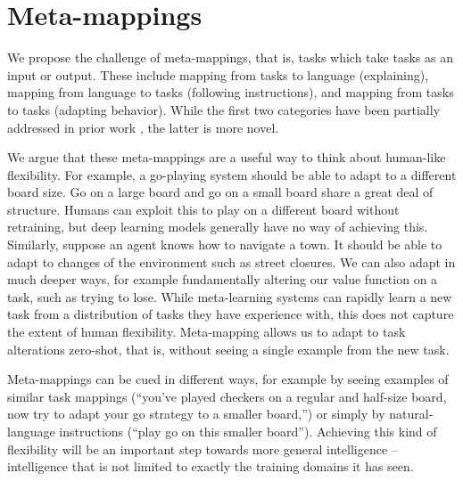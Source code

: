 \documentclass{article}
\begin{document}
\section{Meta-mappings}
We propose the challenge of meta-mappings, that is, tasks which take tasks as an input or output. These include mapping from tasks to language (explaining), mapping from language to tasks (following instructions), and mapping from tasks to tasks (adapting behavior). While the first two categories have been partially addressed in prior work \citep[e.g.][]{Hermann2017, Co-Reyes2019}, the latter is more novel. \par
We argue that these meta-mappings are a useful way to think about human-like flexibility. For example, a go-playing system should be able to adapt to a different board size. Go on a large board and go on a small board share a great deal of structure. Humans can exploit this to play on a different board without retraining, but deep learning models generally have no way of achieving this. Similarly, suppose an agent knows how to navigate a town. It should be able to adapt to changes of the environment such as street closures. We can also adapt in much deeper ways, for example fundamentally altering our value function on a task, such as trying to lose. While meta-learning systems can rapidly learn a new task from a distribution of tasks they have experience with, this does not capture the extent of human flexibility. Meta-mapping allows us to adapt to task alterations zero-shot, that is, without seeing a single example from the new task. \par
Meta-mappings can be cued in different ways, for example by seeing examples of similar task mappings (``you've played checkers on a regular and half-size board, now try to adapt your go strategy to a smaller board,'') or simply by natural-language instructions (``play go on this smaller board''). Achieving this kind of flexibility will be an important step towards more general intelligence -- intelligence that is not limited to exactly the training domains it has seen. \par 
\end{document}

